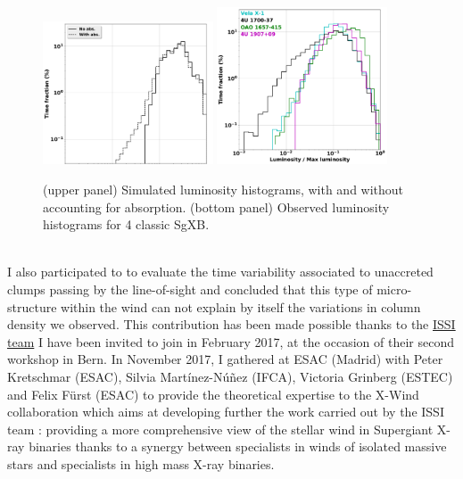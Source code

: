 \documentclass[a4paper,12pt,onecolumn]{article}
\makeatletter
\newcommand{\sgx}{SgXB\xspace}
\newcommand*{\rlof}{RLOF\@\xspace}
\makeatother
\begin{document}
\begin{figure}
\vspace*{-0.2cm}
\captionsetup[subfigure]{labelformat=empty}
\centering
\includegraphics[width=0.45\textwidth]{Figures/lum_diag.pdf}
\includegraphics[width=0.45\textwidth]{Figures/obs_diag.pdf}
\caption{(upper panel) Simulated luminosity histograms, with and without accounting for absorption. (bottom panel) Observed luminosity histograms for 4 classic \sgx \citep[from][]{ElMellah}.} \label{fig:diag}
\end{figure} 
\phantom{m}\\
\indent I also participated to \cite{Grinberg2017} to evaluate the time variability associated to unaccreted clumps passing by the line-of-sight and concluded that this type of micro-structure within the wind can not explain by itself the variations in column density we observed. This contribution has been made possible thanks to the \href{http://www.issibern.ch/teams/stellarwindxray/}{ISSI team} I have been invited to join in February 2017, at the occasion of their second workshop in Bern. In November 2017, I gathered at ESAC (Madrid) with Peter Kretschmar (ESAC), Silvia Mart\'{i}nez-N\'{u}\~{n}ez (IFCA), Victoria Grinberg (ESTEC) and Felix F\"{u}rst (ESAC) to provide the theoretical expertise to the X-Wind collaboration which aims at developing further the work carried out by the ISSI team : providing a more comprehensive view of the stellar wind in Supergiant X-ray binaries thanks to a synergy between specialists in winds of isolated massive stars and specialists in high mass X-ray binaries.\\ \\
\end{document}
